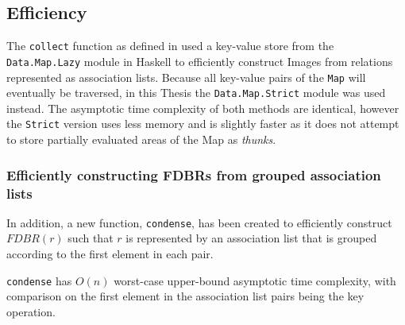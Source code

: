 \documentclass[../main.tex]{subfiles}
\begin{document}
\subsection{Efficiency}

The \texttt{collect} function as defined in \cite{agboola2015extensible} used a key-value store from the \texttt{Data.Map.Lazy} module in Haskell to efficiently construct Images from relations represented as association lists.  Because all key-value pairs of the \texttt{Map} will eventually be traversed, in this Thesis the \texttt{Data.Map.Strict} module was used instead.  The asymptotic time complexity of both methods are identical, however the \texttt{Strict} version uses less memory and is slightly faster as it does not attempt to store partially evaluated areas of the Map as {\em thunks}.






\subsubsection{Efficiently constructing FDBRs from grouped association lists}
In addition, a new function, \texttt{condense}, has been created to efficiently construct $FDBR(r)$ such that $r$ is represented by an association list that is grouped according to the first element in each pair.


\begin{theorem}
	\texttt{condense} has $O(n)$ worst-case upper-bound asymptotic time complexity, with comparison on the first element in the association list pairs being the key operation.
\end{theorem}
\end{document}
